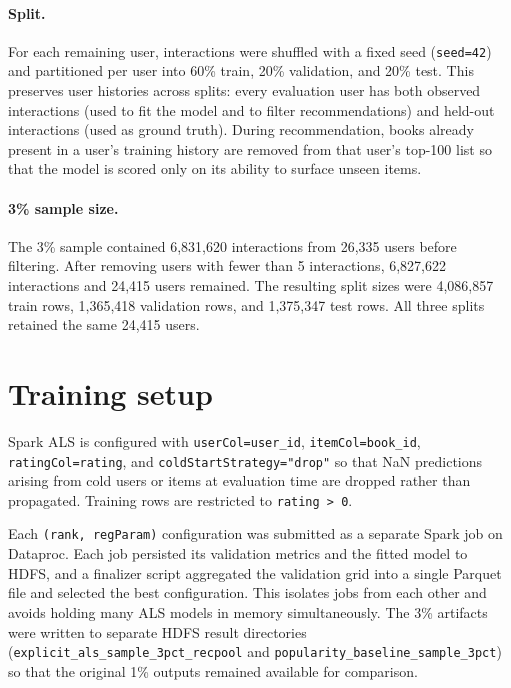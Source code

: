 \documentclass[10pt,twocolumn]{article}
\begin{document}
\paragraph{Split.} For each remaining user, interactions were shuffled with a fixed seed (\texttt{seed=42}) and partitioned per user into 60\% train, 20\% validation, and 20\% test. This preserves user histories across splits: every evaluation user has both observed interactions (used to fit the model and to filter recommendations) and held-out interactions (used as ground truth). During recommendation, books already present in a user's training history are removed from that user's top-100 list so that the model is scored only on its ability to surface unseen items.

\paragraph{3\% sample size.} The 3\% sample contained 6,831,620 interactions from 26,335 users before filtering. After removing users with fewer than 5 interactions, 6,827,622 interactions and 24,415 users remained. The resulting split sizes were 4,086,857 train rows, 1,365,418 validation rows, and 1,375,347 test rows. All three splits retained the same 24,415 users.

\section{Training setup}
Spark ALS is configured with \texttt{userCol=user\_id}, \texttt{itemCol=book\_id}, \texttt{ratingCol=rating}, and \texttt{coldStartStrategy="drop"} so that NaN predictions arising from cold users or items at evaluation time are dropped rather than propagated. Training rows are restricted to \texttt{rating > 0}.

Each \texttt{(rank, regParam)} configuration was submitted as a separate Spark job on Dataproc. Each job persisted its validation metrics and the fitted model to HDFS, and a finalizer script aggregated the validation grid into a single Parquet file and selected the best configuration. This isolates jobs from each other and avoids holding many ALS models in memory simultaneously. The 3\% artifacts were written to separate HDFS result directories (\texttt{explicit\_als\_sample\_3pct\_recpool} and \texttt{popularity\_baseline\_sample\_3pct}) so that the original 1\% outputs remained available for comparison.

\end{document}
